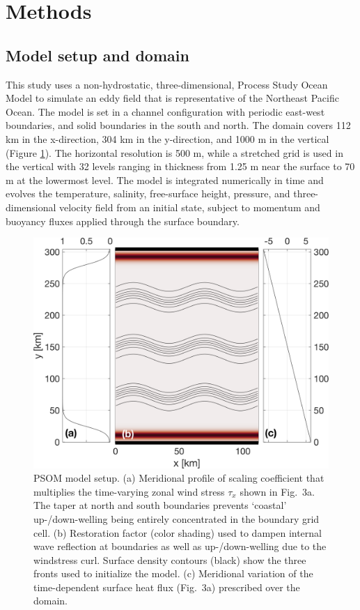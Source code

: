 \documentclass[article,linenumbers]{agujournal2018}
\begin{document}
\section{Methods}
\label{sec: Methods}
\subsection{Model setup and domain}

This study uses a non-hydrostatic, three-dimensional, Process Study Ocean Model \citep[PSOM;][]{Mahadevan_1996a,Mahadevan_1996b} to simulate an eddy field that is representative of the Northeast Pacific Ocean. The model is set in a channel configuration with periodic east-west boundaries, and solid boundaries in the south and north. The domain covers 112 km in the x-direction, 304 km in the y-direction, and 1000 m in the vertical (Figure \ref{fig: model_domain}). The horizontal resolution is 500 m, while a stretched grid is used in the vertical with 32 levels ranging in thickness from 1.25 m near the surface to 70 m at the lowermost level. The model is integrated numerically in time and evolves the temperature, salinity, free-surface height, pressure, and three-dimensional velocity field from an initial state, subject to momentum and buoyancy fluxes applied through the surface boundary.

\begin{figure}[ht]
	\centering
	\includegraphics[width = .6\linewidth]{figures/Fig1_model_domain}
	\caption{PSOM model setup. (a) Meridional profile of scaling coefficient that multiplies the time-varying zonal wind stress $\tau_x$ shown in Fig.~3a. The taper at north and south boundaries prevents `coastal' up-/down-welling being entirely concentrated in the boundary grid cell. (b) Restoration factor (color shading) used to dampen internal wave reflection at boundaries as well as up-/down-welling due to the windstress curl. Surface density contours (black) show the three fronts used to initialize the model. (c) Meridional variation of the time-dependent surface  heat flux (Fig.~3a) prescribed over the domain.}
	\label{fig: model_domain}
\end{figure}
\end{document}
